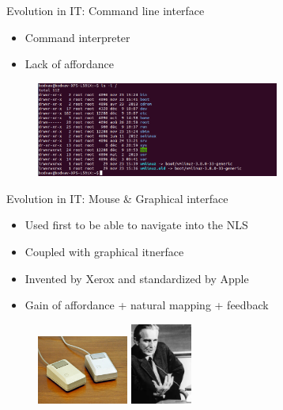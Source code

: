 \documentclass{beamer}
\begin{document}
\begin{frame}{Evolution in IT: Command line interface}

\begin{itemize}
\item Command interpreter
\item Lack of affordance
\end{itemize}
	\begin{figure}
			  \begin{minipage}{5cm}
				  \includegraphics[width=8cm]{terminal.png}
			  \end{minipage}
		
		\end{figure}
\end{frame}
\begin{frame}{Evolution in IT: Mouse \& Graphical interface}
\begin{itemize}
\item Used first to be able to navigate into the NLS
\item Coupled with graphical itnerface
\item Invented by Xerox and standardized by Apple
\item Gain of affordance + natural mapping + feedback
\end{itemize}

\begin{figure}
\raggedleft
	   \begin{minipage}{5cm}
				  \includegraphics[width=3cm]{mice.jpg}
			  \end{minipage}
			  	   \begin{minipage}{5cm}
				  \includegraphics[width=2cm]{doug.jpg}
			  \end{minipage}
\end{figure}
\end{frame}
\end{document}
